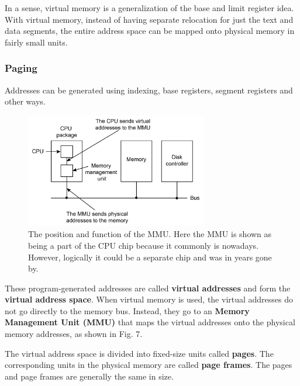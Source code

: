 \documentclass[11pt,a4paper]{article}
\begin{document}
In a sense, virtual memory is a generalization of the base and limit register idea. With virtual memory, instead of having separate relocation for just the text and data segments, the entire address space can be mapped onto physical memory in fairly small units.

\subsubsection{Paging}
Addresses can be generated using indexing, base registers, segment registers and other ways.

\begin{figure}[h!]
	\centering
		\includegraphics[width=300px]{img/mmu-01.png}
	\caption{The position and function of the MMU. Here the MMU is shown as being a part of the CPU chip because it commonly is nowadays. However, logically it could be a separate chip and was in years gone by.}
\end{figure}

These program-generated addresses are called \textbf{virtual addresses} and form the \textbf{virtual address space}. When virtual memory is used, the virtual addresses do not go directly to the memory bus. Instead, they go to an \textbf{Memory Management Unit (MMU)} that maps the virtual addresses onto the physical memory addresses, as shown in Fig. 7.

The virtual address space is divided into fixed-size units called \textbf{pages}. The corresponding units in the physical memory are called \textbf{page frames}. The pages and page frames are generally the same in size. 
\end{document}
